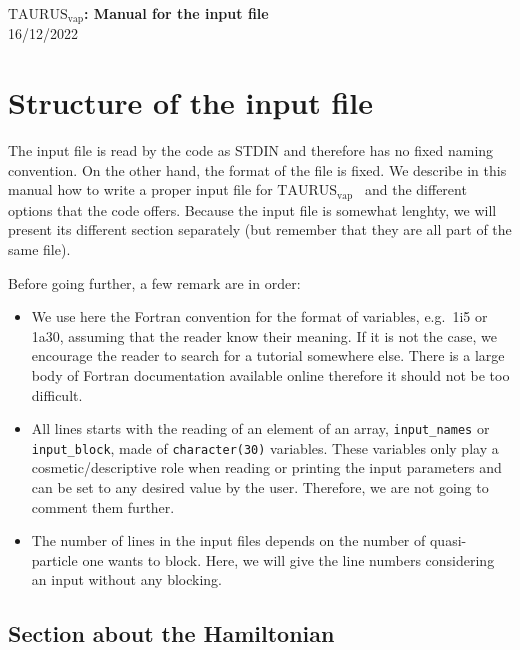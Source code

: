 \documentclass[a4paper,11pt]{article}
\newcommand{\TAURUSvap}{$\text{TAURUS}_{\text{vap}}$}
\newcommand{\ttt}[1]{\texttt{#1}}
\begin{document}
%
% 
\begin{center}
 {\LARGE \textbf{\TAURUSvap: Manual for the input file}} \\
 {\large 16/12/2022}
\end{center}

%
% 
\section{Structure of the input file}

The input file is read by the code as STDIN and therefore has no fixed naming convention. 
On the other hand, the format of the file is fixed. We describe in this manual how to write a proper input file for \TAURUSvap~
and the different options that the code offers.
Because the input file is somewhat lenghty, we will present its different section separately (but remember that they
are all part of the same file).
 
\noindent Before going further, a few remark are in order:
\begin{itemize}
  \item We use here the Fortran convention for the format of variables, e.g.\ 1i5 or 1a30, assuming that the reader
  know their meaning. If it is not the case, we encourage the reader to search for a tutorial somewhere else.
  There is a large body of Fortran documentation available online therefore it should not be too difficult.

  \item All lines starts with the reading of an element of an array, \ttt{input\_names} or \ttt{input\_block},
  made of \ttt{character(30)} variables. 
  These variables only play a cosmetic/descriptive role when reading or printing the input parameters and can be
  set to any desired value by the user. Therefore, we are not going to comment them further.

  \item The number of lines in the input files depends on the number of quasi-particle one wants to block. Here, we will give
  the line numbers considering an input without any blocking.
\end{itemize}

%
%
\subsection{Section about the Hamiltonian}
\end{document}
